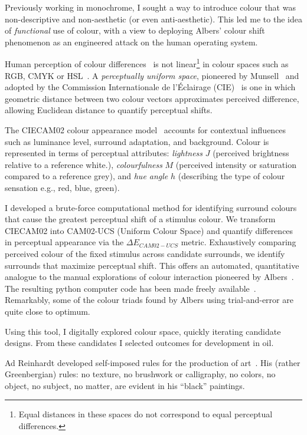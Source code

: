 \documentclass[12pt]{article}
\begin{document}
Previously working in monochrome, I sought a way to introduce
colour that was non-descriptive and non-aesthetic (or even
anti-aesthetic). This led me to the idea of \emph{functional} use of
colour, with a view to deploying Albers' colour shift phenomenon
as an engineered attack on the human operating system.

Human perception of colour differences~\cite{MacAdam1942} is not
linear\footnote{Equal distances in these spaces do not correspond to
  equal perceptual differences.} in colour spaces such as RGB, CMYK or
HSL~\cite{Luo2001CIECAM02}.  A \emph{perceptually uniform space},
pioneered by Munsell~\cite{Munsell1915} and adopted by the Commission
Internationale de l'\'{E}clairage
(CIE)~\cite{CIE1976,CIE1978Uniform,Luo2001CIEDE2000} is one in which
geometric distance between two colour vectors approximates perceived
difference, allowing Euclidean distance to quantify perceptual shifts.

The CIECAM02 colour appearance
model~\cite{Luo2001CIECAM02,CIE1592004} accounts for
contextual influences such as luminance level, surround adaptation,
and background. Colour is represented in terms of perceptual
attributes: \emph{lightness} $J$ (perceived brightness relative to a
reference white.), \emph{colourfulness} $M$ (perceived intensity or
saturation compared to a reference grey), and \emph{hue angle} $h$
(describing the type of colour sensation e.g., red, blue, green).

I developed a brute-force computational method for identifying
surround colours that cause the greatest perceptual shift of a
stimulus colour. We transform CIECAM02 into CAM02-UCS (Uniform Colour
Space) and quantify differences in perceptual appearance via the
$\Delta E_{CAM02-UCS}$ metric. Exhaustively comparing perceived colour
of the fixed stimulus across candidate surrounds, we identify
surrounds that maximize perceptual shift. This offers an automated,
quantitative analogue to the manual explorations of colour interaction
pioneered by Albers~\cite{albers}. The resulting python computer code
has been made freely
available~\cite{grant2025colourshift}. Remarkably, some of the colour
triads found by Albers using trial-and-error are quite close to
optimum.

Using this tool, I digitally explored colour space, quickly iterating
candidate designs. From these candidates I selected outcomes for
development in oil.

Ad Reinhardt developed self-imposed rules for the production of
art~\cite[p. 203-7]{artasart}. His (rather Greenbergian) rules: no
texture, no brushwork or calligraphy, no colors, no object, no
subject, no matter, are evident in his ``black'' paintings.
\end{document}
